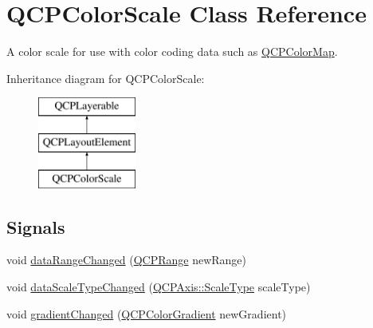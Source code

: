 \hypertarget{classQCPColorScale}{\section{\-Q\-C\-P\-Color\-Scale \-Class \-Reference}
\label{classQCPColorScale}
}


\-A color scale for use with color coding data such as \hyperlink{classQCPColorMap}{\-Q\-C\-P\-Color\-Map}.  


\-Inheritance diagram for \-Q\-C\-P\-Color\-Scale\-:\begin{figure}[H]
\begin{center}
\leavevmode
\includegraphics[height=3.000000cm]{classQCPColorScale}
\end{center}
\end{figure}
\subsection*{\-Signals}
\begin{DoxyCompactItemize}
\item 
void \hyperlink{classQCPColorScale_a293176da9447ec6819be1d901966a257}{data\-Range\-Changed} (\hyperlink{classQCPRange}{\-Q\-C\-P\-Range} new\-Range)
\item 
void \hyperlink{classQCPColorScale_a61558b962f7791ff2f15a565dcf60181}{data\-Scale\-Type\-Changed} (\hyperlink{classQCPAxis_a36d8e8658dbaa179bf2aeb973db2d6f0}{\-Q\-C\-P\-Axis\-::\-Scale\-Type} scale\-Type)
\item 
void \hyperlink{classQCPColorScale_a67a5eb06cf551d322885e8635a46378c}{gradient\-Changed} (\hyperlink{classQCPColorGradient}{\-Q\-C\-P\-Color\-Gradient} new\-Gradient)
\end{DoxyCompactItemize}
